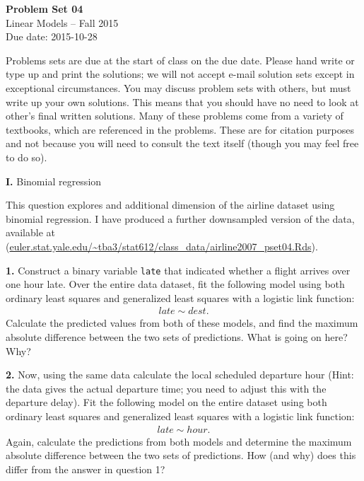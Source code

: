 \documentclass[12pt]{article}
\begin{document}
\begin{center}
{\bf Problem Set 04} \\
Linear Models -- Fall 2015 \\
Due date: 2015-10-28
\end{center}

\medskip

Problems sets are due at the start of class on the due date. Please hand write
or type up and print the solutions; we will not accept e-mail solution sets except
in exceptional circumstances. You may discuss problem sets with others, but must
write up your own solutions. This means that you should have no need to look at other's
final written solutions. Many of these problems come from a variety of textbooks,
which are referenced in the problems. These are for citation purposes and not because
you will need to consult the text itself (though you may feel free to do so).

\medskip

{\bf I.} Binomial regression

This question explores and additional dimension of the airline dataset using binomial
regression. I have produced a further downsampled version of the data, available at
(\url{euler.stat.yale.edu/~tba3/stat612/class_data/airline2007_pset04.Rds}).

{\bf 1.} Construct a binary variable \texttt{late} that indicated whether a flight arrives
over one hour late. Over the entire data dataset, fit the following model using both
ordinary least squares and generalized least squares with a logistic link function:
\begin{align}
late \sim dest.
\end{align}
Calculate the predicted values from both of these models, and find the maximum absolute
difference between the two sets of predictions. What is going on here? Why?

{\bf 2.} Now, using the same data calculate the local scheduled departure hour (Hint:
the data gives the actual departure time; you need to adjust this with the departure
delay). Fit the following model on the entire dataset using both
ordinary least squares and generalized least squares with a logistic link function:
\begin{align}
late \sim hour. \label{hourReg}
\end{align}
Again, calculate the predictions from both models and determine the maximum absolute
difference between the two sets of predictions. How (and why) does this differ from
the answer in question 1?
\end{document}
